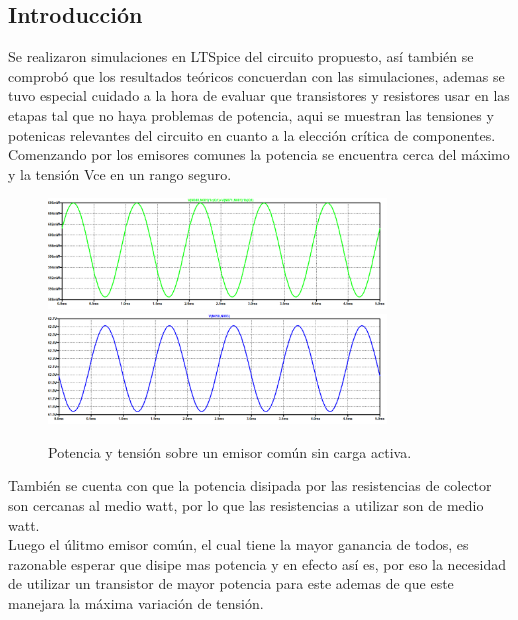 
\subsection{Introducción}
Se realizaron simulaciones en LTSpice del circuito propuesto, así también se comprobó que los resultados teóricos concuerdan con las simulaciones, ademas se tuvo especial cuidado a la hora de evaluar que transistores y resistores usar en las etapas tal que no haya problemas de potencia, aqui se muestran las tensiones y potenicas relevantes del circuito en cuanto a la elección crítica de componentes.\\
Comenzando por los emisores comunes la potencia se encuentra cerca del máximo y la tensión Vce en un rango seguro.

\begin{figure}[H]
	\centering
	\includegraphics[width=0.8\textwidth]{ImagenesSimulaciones/PEC1.png}
		\includegraphics[width=0.8\textwidth]{ImagenesSimulaciones/VEC1.png}
	\caption{Potencia y tensión sobre un emisor común sin carga activa.}
	\label{fig:pec1}
\end{figure}También se cuenta con que la potencia disipada por las resistencias de colector son cercanas al medio watt, por lo que las resistencias a utilizar son de medio watt.\\
Luego el úlitmo emisor común, el cual tiene la mayor ganancia de todos, es razonable esperar que disipe mas potencia y en efecto así es, por eso la necesidad de utilizar un transistor de mayor potencia para este ademas de que este manejara la máxima variación de tensión.

